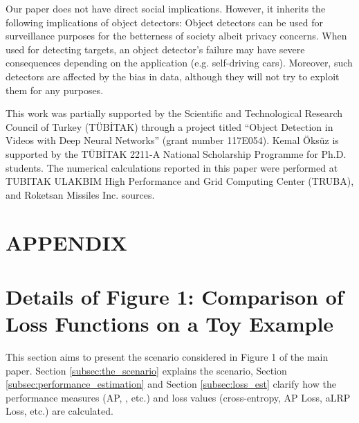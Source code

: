 \documentclass{article}
\begin{document}
Our paper does not have direct social implications. However, it inherits the following implications of object detectors: Object detectors can be used for surveillance purposes for the betterness of society albeit privacy concerns. When used for detecting targets, an object detector's failure may have severe consequences depending on the application (e.g. self-driving cars). Moreover, such detectors are affected by the bias in data, although they will not try to exploit them for any purposes.

 \begin{ack}
This work was partially supported by the Scientific and Technological Research Council of Turkey (T\"UB\.ITAK) through a project titled ``Object Detection in Videos with Deep Neural Networks'' (grant number 117E054). Kemal \"Oks\"uz is supported by the T\"UB\.ITAK 2211-A National Scholarship Programme for Ph.D. students. The numerical calculations reported in this paper were performed at TUBITAK ULAKBIM High Performance and Grid Computing Center (TRUBA), and Roketsan Missiles Inc. sources.
\end{ack} 


\appendix
\section*{APPENDIX}




\renewcommand{\thefigure}{A.\arabic{figure}}
\renewcommand{\thetable}{A.\arabic{table}}
\renewcommand{\thetheorem}{A.\arabic{theorem}}
\renewcommand{\theequation}{A.\arabic{equation}}
\renewcommand{\thealgorithm}{A.\arabic{algorithm}}

\section{Details of Figure 1: Comparison of Loss Functions on a Toy Example}
\label{sec:Teaser}



This section aims to present the scenario considered in Figure 1 of the main paper. Section \ref{subsec:the_scenario} explains the scenario, Section \ref{subsec:performance_estimation} and Section \ref{subsec:loss_est} clarify how the performance measures (AP, , etc.) and loss values (cross-entropy, AP Loss, aLRP Loss, etc.) are calculated.
\end{document}
